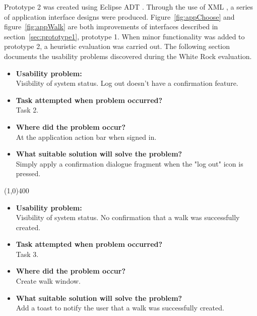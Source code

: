 \documentclass[11pt,a4paper]{article}
\begin{document}
Prototype 2 was created using Eclipse ADT \cite{eclipse}. Through the use of XML \cite{xml}, a series of application interface designs were produced. Figure~\ref{fig:appChoose} and figure~\ref{fig:appWalk} are both improvements of interfaces described in section~\ref{sec:prototype1}, prototype 1. When minor functionality was added to prototype 2, a heuristic evaluation was carried out. The following section documents the usability problems discovered during the White Rock evaluation. 

\begin{itemize}
	\item\textbf{Usability problem:}\\
	Visibility of system status. Log out doesn't have a confirmation feature.

	\item\textbf{Task attempted when problem occurred?}\\
	Task 2.

	\item\textbf{Where did the problem occur?}\\
	At the application action bar when signed in.

	\item\textbf{What suitable solution will solve the problem?}\\
	Simply apply a confirmation dialogue fragment when the "log out" icon is pressed.

\end{itemize}

\line(1,0){400}

\begin{itemize}
	\item\textbf{Usability problem:}\\
	Visibility of system status. No confirmation that a walk was successfully created.

	\item\textbf{Task attempted when problem occurred?}\\
	Task 3.

	\item\textbf{Where did the problem occur?}\\
	Create walk window.

	\item\textbf{What suitable solution will solve the problem?}\\
	Add a toast to notify the user that a walk was successfully created.

\end{itemize}
\end{document}
